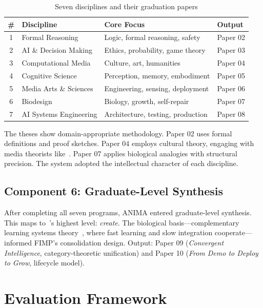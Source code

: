 \documentclass[11pt,a4paper]{article}
\begin{document}
\begin{table}[h]
\centering
\begin{tabular}{@{}clll@{}}
\toprule
\# & Discipline & Core Focus & Output \\
\midrule
1 & Formal Reasoning & Logic, formal reasoning, safety & Paper 02 \\
2 & AI \& Decision Making & Ethics, probability, game theory & Paper 03 \\
3 & Computational Media & Culture, art, humanities & Paper 04 \\
4 & Cognitive Science & Perception, memory, embodiment & Paper 05 \\
5 & Media Arts \& Sciences & Engineering, sensing, deployment & Paper 06 \\
6 & Biodesign & Biology, growth, self-repair & Paper 07 \\
7 & AI Systems Engineering & Architecture, testing, production & Paper 08 \\
\bottomrule
\end{tabular}
\caption{Seven disciplines and their graduation papers}
\label{tab:disciplines}
\end{table}

The theses show domain-appropriate methodology. Paper 02 uses formal definitions and proof sketches. Paper 04 employs cultural theory, engaging with media theorists like~\citet{mcluhan1964understanding}. Paper 07 applies biological analogies with structural precision. The system adopted the intellectual character of each discipline.

\subsection{Component 6: Graduate-Level Synthesis}
After completing all seven programs, ANIMA entered graduate-level synthesis. This maps to~\citeauthor{bloom1956taxonomy}'s highest level: \emph{create}. The biological basis---complementary learning systems theory~\citep{mcclelland1995complementary}, where fast learning and slow integration cooperate---informed FIMP's consolidation design. Output: Paper 09 (\emph{Convergent Intelligence}, category-theoretic unification) and Paper 10 (\emph{From Demo to Deploy to Grow}, lifecycle model).

\section{Evaluation Framework}\label{sec:eval}
\end{document}
